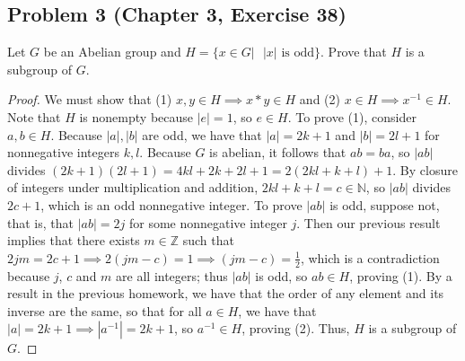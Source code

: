 \documentclass{article}
\begin{document}
\subsection*{Problem 3 (Chapter 3, Exercise 38)}
Let $G$ be an Abelian group and $H = \{x \in G| \text{ }|x| \text{ is odd}\}$. Prove that $H$ is a subgroup of $G$.

\begin{proof}

We must show that (1) $x, y \in H \implies x \ast y \in H$ and (2) $x \in H \implies x^{-1} \in H$. Note that $H$ is nonempty because $|e| = 1$, so $e \in H$. To prove (1), consider $a, b \in H$. Because $|a|, |b|$ are odd, we have that $|a| = 2k+1$ and $|b| = 2l+1$ for nonnegative integers $k, l$. Because $G$ is abelian, it follows that $ab = ba$, so $|ab|$ divides $(2k+1)(2l+1) = 4kl + 2k + 2l + 1 = 2(2kl+k+l) + 1$. By closure of integers under multiplication and addition, $2kl+k+l = c \in \mathbb{N}$, so $|ab|$ divides $2c+1$, which is an odd nonnegative integer. To prove $|ab|$ is odd, suppose not, that is, that $|ab| = 2j$ for some nonnegative integer $j$. Then our previous result implies that there exists $m \in \mathbb{Z}$ such that $2jm = 2c + 1 \implies 2(jm-c) = 1 \implies (jm-c) = \frac{1}{2}$, which is a contradiction because $j$, $c$ and $m$ are all integers; thus $|ab|$ is odd, so $ab \in H$, proving (1). By a result in the previous homework, we have that the order of any element and its inverse are the same, so that for all $a \in H$, we have that $|a| = 2k+1 \implies |a^{-1}|=2k+1$, so $a^{-1} \in H$, proving (2). Thus, $H$ is a subgroup of $G$.


\end{proof}
\end{document}

